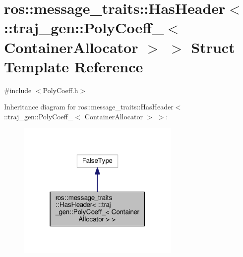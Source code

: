 \hypertarget{structros_1_1message__traits_1_1_has_header_3_01_1_1traj__gen_1_1_poly_coeff___3_01_container_allocator_01_4_01_4}{}\section{ros\+:\+:message\+\_\+traits\+:\+:Has\+Header$<$ \+:\+:traj\+\_\+gen\+:\+:Poly\+Coeff\+\_\+$<$ Container\+Allocator $>$ $>$ Struct Template Reference}
\label{structros_1_1message__traits_1_1_has_header_3_01_1_1traj__gen_1_1_poly_coeff___3_01_container_allocator_01_4_01_4}


{\ttfamily \#include $<$Poly\+Coeff.\+h$>$}



Inheritance diagram for ros\+:\+:message\+\_\+traits\+:\+:Has\+Header$<$ \+:\+:traj\+\_\+gen\+:\+:Poly\+Coeff\+\_\+$<$ Container\+Allocator $>$ $>$\+:
\nopagebreak
\begin{figure}[H]
\begin{center}
\leavevmode
\includegraphics[width=223pt]{structros_1_1message__traits_1_1_has_header_3_01_1_1traj__gen_1_1_poly_coeff___3_01_container_aldf07fa77c346d7b11e48ed82ff9c3ca8}
\end{center}
\end{figure}


